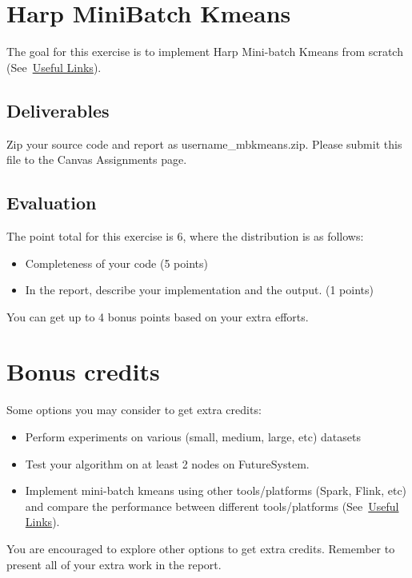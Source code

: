 \section*{Harp Mini\-Batch Kmeans}

The goal for this exercise is to implement Harp Mini-batch Kmeans
from scratch (See~\hyperlink{link_project8}{Useful Links}). 

\subsection*{Deliverables}
Zip your source code and report as username\_mbkmeans.zip. Please submit this
file to the Canvas Assignments page.

\subsection*{Evaluation}

The point total for this exercise is 6, where the distribution is as
follows:

\begin{itemize}
\item Completeness of your code (5 points)
\item In the report, describe your implementation and the output. (1 points)
\end{itemize}

You can get up to 4 bonus points based on your extra efforts.

\section*{Bonus credits}

Some options you may consider to get extra credits: 

\begin{itemize}
\item Perform experiments on various (small, medium, large, etc)
  datasets
\item Test your algorithm on at least 2 nodes on FutureSystem.
\item Implement mini-batch kmeans using other tools/platforms (Spark,
  Flink, etc) and compare the performance between different
  tools/platforms (See~\hyperlink{link_project8}{Useful Links}).
\end{itemize}

You are encouraged to explore other options to get extra
credits. Remember to present all of your extra work in the report.
 
